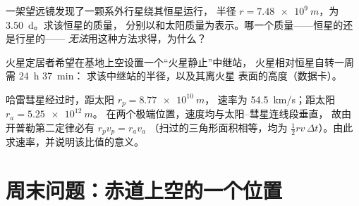 \begin{exercise}[$\star\star\star$]\label{exo:g12:satellites-kepler:13}
一架望远镜发现了一颗系外行星绕其恒星运行，
半径 $r = \qty{7.48e9}{m}$，为 \qty{3.50}{d}。求该恒星的质量，
分别以和太阳质量为表示。哪一个质量——恒星的还是行星的——
\emph{无法}用这种方法求得，为什么？
\end{exercise}

\begin{exercise}[$\star\star\star$]\label{exo:g12:satellites-kepler:14}
火星定居者希望在基地上空设置一个“火星静止”中继站，
火星相对恒星自转一周需 \qty{24}{h} \qty{37}{min}：
求该中继站的半径，以及其离火星
表面的高度（数据卡）。
\end{exercise}

\begin{exercise}[$\star\star\star$]\label{exo:g12:satellites-kepler:15}
哈雷彗星经过时，距太阳 $r_p = \qty{8.77e10}{m}$，
速率为 \qty{54.5}{km/s}；距太阳 $r_a = \qty{5.25e12}{m}$。
在两个极端位置，速度均与太阳–彗星连线段垂直，
故由开普勒第二定律必有 $r_p v_p = r_a v_a$
（扫过的三角形面积相等，均为 $\tfrac12 r v\,\Delta t$）。由此
求速率，并说明该比值的意义。
\end{exercise}

\section{周末问题：赤道上空的一个位置}

